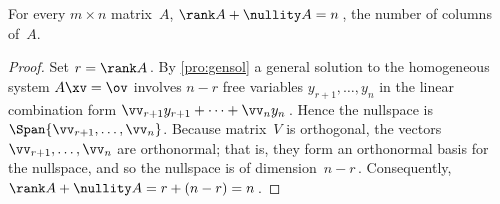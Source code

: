 \begin{theorem} \label{thm:rank} 
For every \(m\times n\) matrix~\(A\),  \(\rank A+\nullity A=n\)\,, the number of columns of~\(A\).
\end{theorem}
\begin{proof} 
Set \(r=\rank A\)\,.
By \cref{pro:gensol} a {general solution} to the homogeneous system \(A\xv=\ov\) involves \(n-r\) free variables \(y_{r+1},\ldots,y_n\) in the linear combination form \(\vv_{r+1}y_{r+1}+\cdots +\vv_ny_n\)\,.  
Hence the nullspace is \(\Span\{\vv_{r+1},\ldots,\vv_n\}\).
Because matrix~\(V\) is orthogonal, the vectors \(\vv_{r+1},\ldots,\vv_n\) are orthonormal; that is, they form an orthonormal basis for the nullspace, and so the nullspace is of dimension~\(n-r\)\,.
Consequently, \(\rank A+\nullity A=r+(n-r)=n\)\,.
\end{proof}



